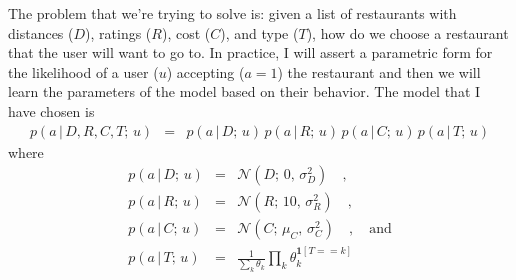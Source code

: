 \documentclass[11pt]{article}
\begin{document}
The problem that we're trying to solve is: given a list of restaurants with
distances ($D$), ratings ($R$), cost ($C$), and type ($T$), how do we choose a
restaurant that the user will want to go to.
In practice, I will assert a parametric form for the likelihood of a user
($u$) accepting ($a=1$) the restaurant and then we will learn the parameters
of the model based on their behavior.
The model that I have chosen is
\begin{eqnarray}
p(a\,|\,D,R,C,T;\,u) &=&
    p(a\,|\,D;\,u)\,p(a\,|\,R;\,u)\,p(a\,|\,C;\,u)\,p(a\,|\,T;\,u)
\end{eqnarray}
where
\begin{eqnarray}
p(a\,|\,D;\,u) &=& \mathcal{N}(D;\,0,\,\sigma_D^2) \quad, \\
p(a\,|\,R;\,u) &=& \mathcal{N}(R;\,10,\,\sigma_R^2) \quad, \\
p(a\,|\,C;\,u) &=& \mathcal{N}(C;\,\mu_C,\,\sigma_C^2) \quad,\quad\mbox{and} \\
p(a\,|\,T;\,u) &=& \frac{1}{\sum_k \theta_k}\prod_k \theta_k^{\mathbf{1}[T==k]}
\end{eqnarray}
\end{document}
